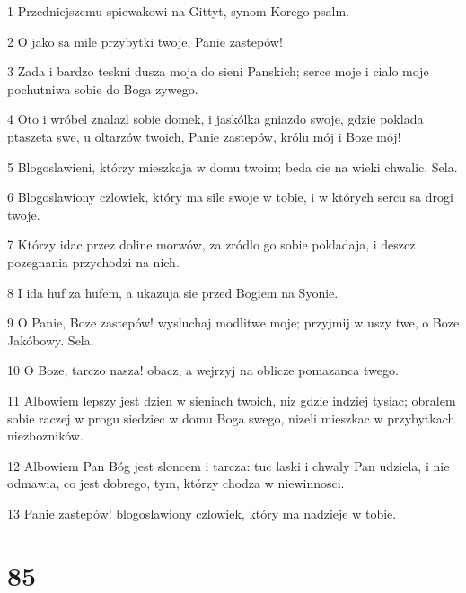 \par 1 Przedniejszemu spiewakowi na Gittyt, synom Korego psalm.
\par 2 O jako sa mile przybytki twoje, Panie zastepów!
\par 3 Zada i bardzo teskni dusza moja do sieni Panskich; serce moje i cialo moje pochutniwa sobie do Boga zywego.
\par 4 Oto i wróbel znalazl sobie domek, i jaskólka gniazdo swoje, gdzie poklada ptaszeta swe, u oltarzów twoich, Panie zastepów, królu mój i Boze mój!
\par 5 Blogoslawieni, którzy mieszkaja w domu twoim; beda cie na wieki chwalic. Sela.
\par 6 Blogoslawiony czlowiek, który ma sile swoje w tobie, i w których sercu sa drogi twoje.
\par 7 Którzy idac przez doline morwów, za zródlo go sobie pokladaja, i deszcz pozegnania przychodzi na nich.
\par 8 I ida huf za hufem, a ukazuja sie przed Bogiem na Syonie.
\par 9 O Panie, Boze zastepów! wysluchaj modlitwe moje; przyjmij w uszy twe, o Boze Jakóbowy. Sela.
\par 10 O Boze, tarczo nasza! obacz, a wejrzyj na oblicze pomazanca twego.
\par 11 Albowiem lepszy jest dzien w sieniach twoich, niz gdzie indziej tysiac; obralem sobie raczej w progu siedziec w domu Boga swego, nizeli mieszkac w przybytkach niezbozników.
\par 12 Albowiem Pan Bóg jest sloncem i tarcza: tuc laski i chwaly Pan udziela, i nie odmawia, co jest dobrego, tym, którzy chodza w niewinnosci.
\par 13 Panie zastepów! blogoslawiony czlowiek, który ma nadzieje w tobie.

\chapter{85}

